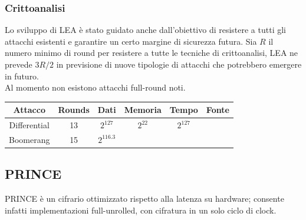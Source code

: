 \documentclass[target=bach,aauheader=,style=]{thud}
\begin{document}
			\subsubsection{Crittoanalisi}
			Lo sviluppo di LEA è stato guidato anche dall'obiettivo di resistere a tutti gli attacchi esistenti e garantire un certo margine di sicurezza futura. Sia $R$ il numero minimo di round per resistere a tutte le tecniche di crittoanalisi, LEA ne prevede $3R/2$ in previsione di nuove tipologie di attacchi che potrebbero emergere in futuro.\\
			Al momento non esistono attacchi full-round noti.
			\begin{center}
				\begin{tabular}{ |c|c|c|c|c|c| } 
					\hline
					Attacco & Rounds & Dati & Memoria & Tempo & Fonte \\ 
					\hline 
					\hline
					Differential & 13 & $2^{127}$ & $2^{22}$ & $2^127$ & \cite{leadiff} \\
					\hline
					Boomerang & 15 & $2^{116.3}$ & & & \cite{lea} \\
					\hline
				\end{tabular}
			\end{center}
		\subsection{PRINCE}\cite{prince}
		\label{ssec:prince}
			PRINCE è un cifrario ottimizzato rispetto alla latenza su  hardware; consente infatti implementazioni full-unrolled, con cifratura in un solo ciclo di clock.
\end{document}
